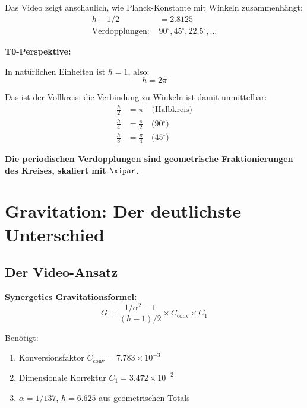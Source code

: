 	Das Video zeigt anschaulich, wie Planck-Konstante mit Winkeln zusammenhängt:
	\begin{align}
		h - 1/2 &= 2.8125 \\
		\text{Verdopplungen: } &90^\circ, 45^\circ, 22.5^\circ, \ldots
	\end{align}
	
	\begin{vorteil}
		\textbf{T0-Perspektive:}
		
		In natürlichen Einheiten ist $\hbar = 1$, also:
		\begin{equation}
			h = 2\pi
		\end{equation}
		
		Das ist der Vollkreis; die Verbindung zu Winkeln ist damit unmittelbar:
		\begin{align}
			\frac{h}{2} &= \pi \quad \text{(Halbkreis)} \\
			\frac{h}{4} &= \frac{\pi}{2} \quad \text{(90$^\circ$)} \\
			\frac{h}{8} &= \frac{\pi}{4} \quad \text{(45$^\circ$)}
		\end{align}
		
		\textbf{Die periodischen Verdopplungen sind geometrische Fraktionierungen des Kreises, skaliert mit $\xipar$.}
	\end{vorteil}
	
	\section{Gravitation: Der deutlichste Unterschied}
	
	\subsection{Der Video-Ansatz}
	
	\textbf{Synergetics Gravitationsformel:}
	\begin{equation}
		G = \frac{1/\alpha^2 - 1}{(h - 1)/2} \times C_{\text{conv}} \times C_1
	\end{equation}
	
	Benötigt:
	\begin{enumerate}
		\item Konversionsfaktor $C_{\text{conv}} = 7.783 \times 10^{-3}$
		\item Dimensionale Korrektur $C_1 = 3.472 \times 10^{-2}$
		\item $\alpha = 1/137$, $h=6.625$ aus geometrischen Totals
	\end{enumerate}
	
